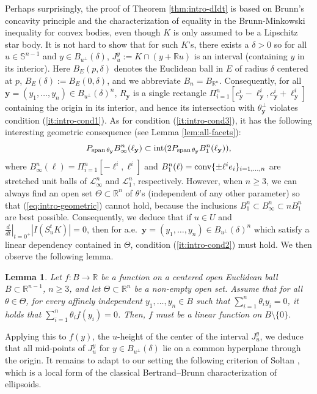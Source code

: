 \documentclass[11pt]{article}
\newtheorem{lemma}[thm]{Lemma}
\theoremstyle{definition}
\theoremstyle{proof}
\DeclareMathOperator{\+}{\mathop{\tilde{+}}}
\DeclareMathOperator{\interior}{\textnormal{int}}
\DeclareMathOperator{\conv}{\textnormal{conv}}
\DeclareMathOperator{\sspan}{\textnormal{span}}
\newcommand{\R}{\mathbb{R}}
\renewcommand{\S}{\mathbb{S}}
\newcommand{\J}{L}
\newcommand{\y}{\mathbf{y}}
\renewcommand{\L}{\mathscr{L}}  \newcommand{\U}{U}\renewcommand{\J}{\mathcal{J}}
\newcommand{\h}{\ell}
\numberwithin{equation}{section}
\numberwithin{equation}{section}
\begin{document}
Perhaps surprisingly, the proof of Theorem \ref{thm:intro-dIdt} is based on Brunn's concavity principle and the characterization of equality in the Brunn-Minkowski inequality for convex bodies, even though $K$ is only assumed to be a Lipschitz star body. 
It is not hard to show that for such $K$'s, there exists a $\delta > 0$ so for all $u \in \S^{n-1}$ and $y \in B_{u^\perp}(\delta)$, $J_u^y := K \cap (y + \R u)$ is an interval (containing $y$ in its interior). Here $B_{E}(p,\delta)$ denotes the Euclidean ball  in $E$ of radius $\delta$ centered at $p$, $B_E(\delta) := B_E(0,\delta)$, and we abbreviate $B_n = B_{\R^n}$. Consequently, for all 
 $\y = (y_1,\ldots,y_n) \in B_{u^\perp}(\delta)^n$, $R_\y$ is a single rectangle $\Pi_{i=1}^n [c^i_{\y} - \h^i_{\y} , c^i_{\y} + \h^i_{\y}]$ containing the origin in its interior, and hence its intersection with $\theta_\y^{\perp}$ violates condition (\ref{it:intro-cond1}). 
As for condition (\ref{it:intro-cond3}), it has the following interesting geometric consequence (see Lemma \ref{lem:all-facets}):
\begin{equation} \label{eq:intro-geometric}
P_{\sspan \theta_\y} B^n_\infty(\h_\y) \subset \interior (2 P_{\sspan \theta_\y} B^n_1(\h_\y)) ,
\end{equation}
where $B^n_\infty(\h) = \Pi_{i=1}^n [-\h^i,\h^i]$ and $B^n_1(\h) = \conv \{\pm \h^i e_i \}_{i=1,\ldots,n}$ are stretched unit balls of $\L_\infty^n$ and $\L_1^n$, respectively. However, when $n \geq 3$, we can always find an open set $\Theta \subset \R^n$ of $\theta$'s (independent of any other parameter) so that (\ref{eq:intro-geometric}) cannot hold, because the inclusions $B_1^n \subset B_\infty^n \subset n B_1^n$ are best possible. Consequently, we deduce that if $u \in \U$ and $\left . \frac{d}{dt} \right|_{t=0^+} |I (S_u^t K)| = 0$, then for a.e.~$\y=(y_1,\ldots,y_n) \in B_{u^{\perp}}(\delta)^n$ which satisfy a linear dependency contained in $\Theta$, condition (\ref{it:intro-cond2}) must hold. We then observe the following lemma. 

\begin{lemma} \label{lem:intro-linear}
Let $f : B \rightarrow \R$ be a function on a centered open Euclidean ball $B \subset \R^{n-1}$, $n \geq 3$, and let $\Theta \subset \R^n$ be a non-empty open set. Assume that for all $\theta \in \Theta$,
for every affinely independent $y_1,\ldots,y_n \in B$ such that $\sum_{i=1}^n \theta_i y_i = 0$, it holds that $\sum_{i=1}^n \theta_i f(y_i) = 0$. 
Then, $f$ must be a linear function on $B \setminus \{0\}$.   
\end{lemma}
Applying this to $f(y)$, the $u$-height of the center of the interval $J_u^y$, we deduce that all mid-points of $J_u^y$ for $y \in  B_{u^\perp}(\delta)$ lie on a common hyperplane through the origin. It remains to adapt to our setting the following criterion of Soltan \cite[Corollary 1]{Soltan-EllipsoidViaMidpoints}, which is a local form of the classical Bertrand--Brunn characterization of ellipsoids.
\end{document}
